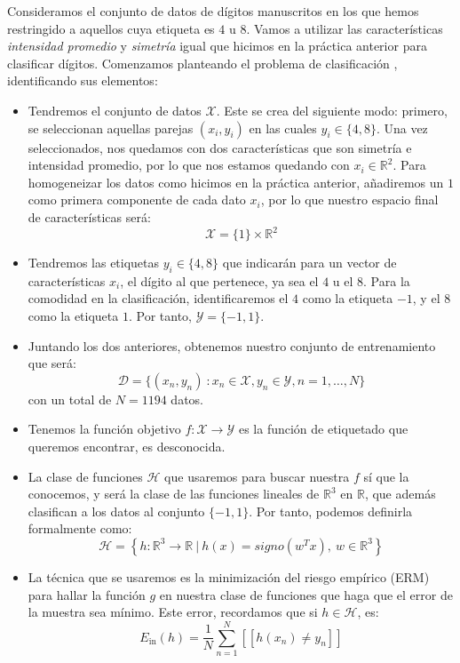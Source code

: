 \documentclass[12pt]{article}
\begin{document}
{Consideramos el conjunto de datos de dígitos manuscritos en los que hemos restringido a aquellos cuya etiqueta es $4$ u $8$. Vamos a utilizar las características \emph{intensidad promedio} y \emph{simetría} igual que hicimos en la práctica anterior para clasificar dígitos. Comenzamos planteando el problema de clasificación , identificando sus elementos:
\begin{itemize}
\item Tendremos el conjunto de datos $\mathcal X$. Este se crea del siguiente modo: primero, se seleccionan aquellas parejas $(x_i,y_i)$ en las cuales $y_i \in \{4,8\}$. Una vez seleccionados, nos quedamos con dos características que son simetría e intensidad promedio, por lo que nos estamos quedando con $x_i \in \mathbb R^2$. Para homogeneizar los datos como hicimos en la práctica anterior, añadiremos un $1$ como primera componente de cada dato $x_i$, por lo que nuestro espacio final de características será:
$$
\mathcal X = \{1\} \times \mathbb R^2
$$
\item Tendremos las etiquetas $y_i \in \{4,8\}$ que indicarán para un vector de características $x_i$, el dígito al que pertenece, ya sea el $4$ u el $8$. Para la comodidad en la clasificación, identificaremos el $4$ como la etiqueta $-1$, y el $8$ como la etiqueta $1$. Por tanto, $\mathcal Y = \{-1,1\}$.

\item Juntando los dos anteriores, obtenemos nuestro conjunto de entrenamiento que será:
$$
\mathcal D = \{(x_n,y_n) \ : x_n \in \mathcal X, y_n \in \mathcal Y, n = 1,\dots,N\}
$$
con un total de $N = 1194$ datos.

\item Tenemos la función objetivo $f: \mathcal X \to \mathcal Y$ es la función de etiquetado que queremos encontrar, es desconocida. 

\item La clase de funciones $\mathcal H$ que usaremos para buscar nuestra $f$ sí que la conocemos, y será la clase de las funciones lineales de $\mathbb R^3$ en $\mathbb R$, que además clasifican a los datos al conjunto $\{-1,1\}$. Por tanto, podemos definirla formalmente como:
$$
\mathcal H = \left\{h : \mathbb R^3 \to \mathbb R \ | \ h(x) = signo(w^T x), \ w \in \mathbb R^3\right\}
$$

\item La técnica que se usaremos es la minimización del riesgo empírico (ERM) para hallar la función $g$ en nuestra clase de funciones que haga que el error de la muestra sea mínimo. Este error, recordamos que si $h \in \mathcal H$, es:
$$
E_{\operatorname{in}}(h) = \frac{1}{N} \sum_{n = 1}^N [[ h(x_n) \neq y_n]]
$$


\end{itemize}}
\end{document}
